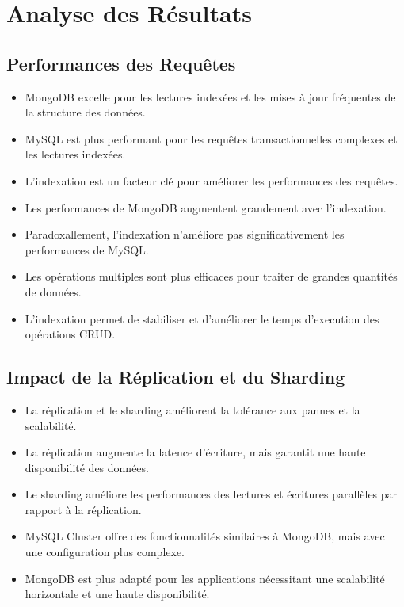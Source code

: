 \documentclass[12pt,a4paper]{report}
\begin{document}
\chapter{Analyse des Résultats}

\section{Performances des Requêtes}

    \begin{card}
        \begin{itemize}
            \item MongoDB excelle pour les lectures indexées et les mises à jour fréquentes de la structure des données.
            \item MySQL est plus performant pour les requêtes transactionnelles complexes et les lectures indexées.
            \item L'indexation est un facteur clé pour améliorer les performances des requêtes.
            \item Les performances de MongoDB augmentent grandement avec l'indexation.
            \item Paradoxallement, l'indexation n'améliore pas significativement les performances de MySQL.
            \item Les opérations multiples sont plus efficaces pour traiter de grandes quantités de données.
            \item L'indexation permet de stabiliser et d'améliorer le temps d'execution des opérations CRUD.
        \end{itemize}
    \end{card}

\section{Impact de la Réplication et du Sharding}

    \begin{card}
        \begin{itemize}
            \item La réplication et le sharding améliorent la tolérance aux pannes et la scalabilité.
            \item La réplication augmente la latence d'écriture, mais garantit une haute disponibilité des données.
            \item Le sharding améliore les performances des lectures et écritures parallèles par rapport à la réplication.
            \item MySQL Cluster offre des fonctionnalités similaires à MongoDB, mais avec une configuration plus complexe.
            \item MongoDB est plus adapté pour les applications nécessitant une scalabilité horizontale et une haute disponibilité.
        \end{itemize}
    \end{card}
\end{document}
